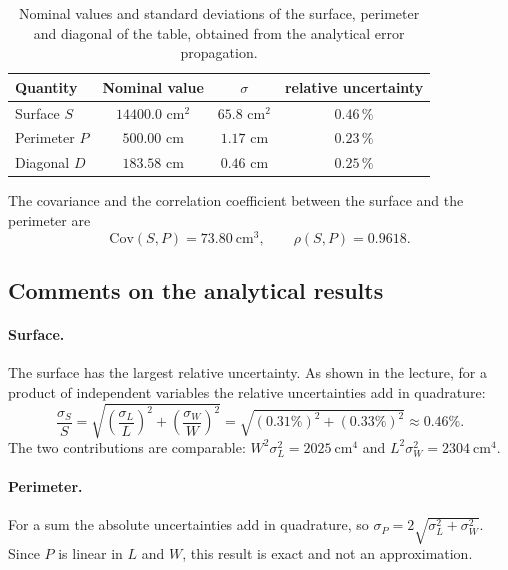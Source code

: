 \documentclass[11pt,a4paper]{article}
\begin{document}
	\begin{table}[!h]
		\centering
		\begin{tabular}{l c c c}
			\hline
			Quantity & Nominal value & $\sigma$ & relative uncertainty \\
			\hline
			Surface $S$   & $14400.0$ cm$^2$ & $65.8$ cm$^2$ & $0.46\,\%$ \\
			Perimeter $P$ & $500.00$ cm      & $1.17$ cm     & $0.23\,\%$ \\
			Diagonal $D$  & $183.58$ cm      & $0.46$ cm     & $0.25\,\%$ \\
			\hline
		\end{tabular}
		\caption{Nominal values and standard deviations of the surface, perimeter and diagonal of the table, obtained from the analytical error propagation.}
		\label{tab:analytical}
	\end{table}
	\FloatBarrier
	
	The covariance and the correlation coefficient between the surface and the perimeter are
	\begin{equation}
		\mathrm{Cov}(S, P) = 73.80 \ \text{cm}^3, \qquad \rho(S, P) = 0.9618 .
	\end{equation}
	
	\subsection*{Comments on the analytical results}
	
	\paragraph{Surface.} The surface has the largest relative uncertainty.
	As shown in the lecture, for a product of independent variables the relative uncertainties add in quadrature:
	\begin{equation}
		\frac{\sigma_S}{S} = \sqrt{\left(\frac{\sigma_L}{L}\right)^2 + \left(\frac{\sigma_W}{W}\right)^2} = \sqrt{(0.31\%)^2 + (0.33\%)^2} \approx 0.46\% .
	\end{equation}
	The two contributions are comparable: $W^2\sigma_L^2 = 2025 \ \text{cm}^4$ and $L^2\sigma_W^2 = 2304 \ \text{cm}^4$.
	
	\paragraph{Perimeter.} For a sum the absolute uncertainties add in quadrature, so $\sigma_P = 2\sqrt{\sigma_L^2 + \sigma_W^2}$.
	Since $P$ is linear in $L$ and $W$, this result is exact and not an approximation.
	
\end{document}
